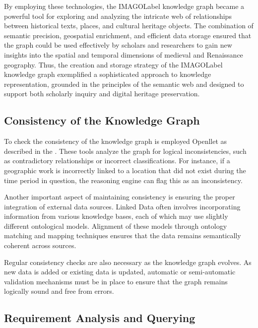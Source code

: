 By employing these technologies, the \acrshort{IMAGOLabel} knowledge graph became a powerful tool for exploring and analyzing the intricate web of relationships between historical texts, places, and cultural heritage objects. The combination of semantic precision, geospatial enrichment, and efficient data storage ensured that the graph could be used effectively by scholars and researchers to gain new insights into the spatial and temporal dimensions of medieval and Renaissance geography. Thus, the creation and storage strategy of the \acrshort{IMAGOLabel} knowledge graph exemplified a sophisticated approach to knowledge representation, grounded in the principles of the semantic web and designed to support both scholarly inquiry and digital heritage preservation.


\subsection{Consistency of the Knowledge Graph}\label{VII-subsec:imago-consistency}

To check the consistency of the knowledge graph is employed Openllet\cite{galigatorGaligatorOpenllet2024} as described in the . These tools analyze the graph for logical inconsistencies, such as contradictory relationships or incorrect classifications. For instance, if a geographic work is incorrectly linked to a location that did not exist during the time period in question, the reasoning engine can flag this as an inconsistency.

Another important aspect of maintaining consistency is ensuring the proper integration of external data sources. Linked Data often involves incorporating information from various knowledge bases, each of which may use slightly different ontological models. Alignment of these models through ontology matching and mapping techniques ensures that the data remains semantically coherent across sources.

Regular consistency checks are also necessary as the knowledge graph evolves. As new data is added or existing data is updated, automatic or semi-automatic validation mechanisms must be in place to ensure that the graph remains logically sound and free from errors.

\subsection{Requirement Analysis and Querying}\label{VII-subsec:imago-querying}

